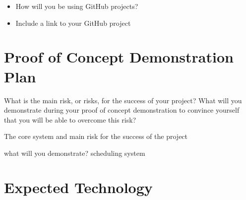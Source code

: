 \documentclass{article}
\begin{document}
\begin{itemize}
  \item How will you be using GitHub projects?
  \item Include a link to your GitHub project
\end{itemize}

\section{Proof of Concept Demonstration Plan}

What is the main risk, or risks, for the success of your project?  What will you
demonstrate during your proof of concept demonstration to convince yourself that
you will be able to overcome this risk?

The core system and main risk for the success of the project 

what will you demonstrate?
scheduling system

\section{Expected Technology}
\end{document}
